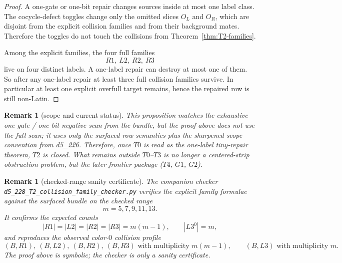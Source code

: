 \documentclass[11pt]{article}
\newtheorem{remark}[theorem]{Remark}
\begin{document}
\begin{proof}
A one-gate or one-bit repair changes sources inside at most one label class.
The cocycle-defect toggles change only the omitted slices $O_L$ and $O_R$, which
are disjoint from the explicit collision families and from their background mates.
Therefore the toggles do not touch the collisions from
Theorem~\ref{thm:T2-families}.

Among the explicit families, the four full families
\[
R1,\ L2,\ R2,\ R3
\]
live on four distinct labels.
A one-label repair can destroy at most one of them.
So after any one-label repair at least three full collision families survive.
In particular at least one explicit overfull target remains, hence the repaired row
is still non-Latin.
\end{proof}

\begin{remark}[scope and current status]
This proposition matches the exhaustive one-gate / one-bit negative scan from the
bundle, but the proof above does not use the full scan; it uses only the surfaced
row semantics plus the sharpened scope convention from d5\_226.
Therefore, once $T0$ is read as the one-label tiny-repair theorem, $T2$ is closed.
What remains outside $T0$--$T3$ is no longer a centered-strip obstruction problem,
but the later frontier package ($T4$, $G1$, $G2$).
\end{remark}

\begin{remark}[checked-range sanity certificate]
The companion checker
\texttt{d5\_228\_T2\_collision\_family\_checker.py} verifies the explicit family
formulae against the surfaced bundle on the checked range
\[
m=5,7,9,11,13.
\]
It confirms the expected counts
\[
|R1|=|L2|=|R2|=|R3|=m(m-1),
\qquad
|L3^0|=m,
\]
and reproduces the observed color-$0$ collision profile
\[
(B,R1),\ (B,L2),\ (B,R2),\ (B,R3)\text{ with multiplicity }m(m-1),
\qquad
(B,L3)\text{ with multiplicity }m.
\]
The proof above is symbolic; the checker is only a sanity certificate.
\end{remark}
\end{document}
